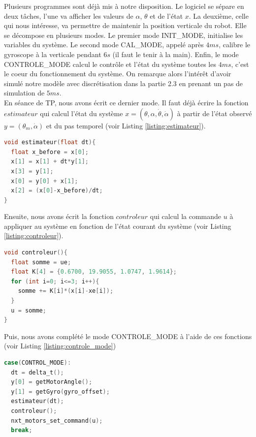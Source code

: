 \documentclass[11pt,french]{article} %
\begin{document}
\quad Plusieurs programmes sont déjà mis à notre disposition. Le logiciel se sépare en deux tâches, l'une va afficher les valeurs de $\alpha$, $\theta$ et de l'état $x$. La deuxième, celle qui nous intéresse, va permettre de maintenir la position verticale du robot. Elle se décompose en plusieurs modes. Le premier mode INIT\_MODE, initialise les variables du système. Le second mode CAL\_MODE, appelé après $4ms$, calibre le gyroscope à la verticale pendant $6s$ (il faut le tenir à la main). Enfin, le mode CONTROLE\_MODE calcul le contrôle et l'état du système toutes les $4ms$, c'est le coeur du fonctionnement du système. On remarque alors l'intérêt d'avoir simulé notre modèle avec discrétisation dans la partie 2.3 en prenant un pas de simulation de $5ms$. \\

\quad En séance de TP, nous avons écrit ce dernier mode. Il faut déjà écrire la fonction $estimateur$ qui calcul l'état du système $x=(\theta, \alpha, \dot\theta, \dot\alpha)$ à partir de l'état observé $y=(\theta_m, \dot\alpha)$ et du pas temporel (voir Listing \ref{listing:estimateur}). \\

\begin{lstlisting}[language=C, caption={Fonction estimateur}, label={listing:estimateur}]
void estimateur(float dt){
  float x_before = x[0];
  x[1] = x[1] + dt*y[1];
  x[3] = y[1];
  x[0] = y[0] + x[1];
  x[2] = (x[0]-x_before)/dt;
}
\end{lstlisting}

\quad Ensuite, nous avons écrit la fonction $controleur$ qui calcul la commande $u$ à appliquer au système en fonction de l'état courant du système (voir Listing \ref{listing:controleur}). \\

\begin{lstlisting}[language=C, caption={Fonction controleur}, label={listing:controleur}]
void controleur(){
  float somme = ue;
  float K[4] = {0.6700, 19.9055, 1.0747, 1.9614};
  for (int i=0; i<=3; i++){
    somme += K[i]*(x[i]-xe[i]);
  }
  u = somme;
}
\end{lstlisting}

\quad Puis, nous avons complété le mode CONTROLE\_MODE à l'aide de ces fonctions (voir Listing \ref{listing:controle_mode})

\begin{lstlisting}[language=C, caption={CONTROLE\_MODE}, label={listing:controle_mode}]
case(CONTROL_MODE):
  dt = delta_t();
  y[0] = getMotorAngle();
  y[1] = getGyro(gyro_offset);
  estimateur(dt);
  controleur();
  nxt_motors_set_command(u);
  break;
\end{lstlisting}
\end{document}
